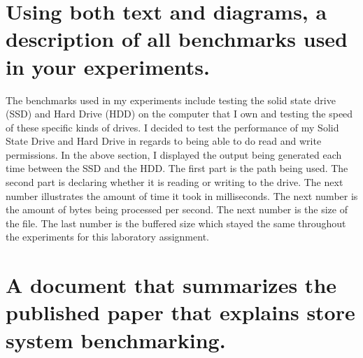 \documentclass{article}
\begin{document}
\section{Using both text and diagrams, a description of all benchmarks used in your experiments.}

The benchmarks used in my experiments include testing the solid state drive (SSD) and Hard Drive (HDD) on the computer that I own and testing the speed of these specific kinds of drives. I decided to test the performance of my Solid State Drive and Hard Drive in regards to being able to do read and write permissions. In the above section, I displayed the output being generated each time between the SSD and the HDD. The first part is the path being used. The second part is declaring whether it is reading or writing to the drive. The next number illustrates the amount of time it took in milliseconds. The next number is the amount of bytes being processed per second. The next number is the size of the file. The last number is the buffered size which stayed the same throughout the experiments for this laboratory assignment.



\section{A document that summarizes the published paper that explains store system benchmarking.}
\end{document}
